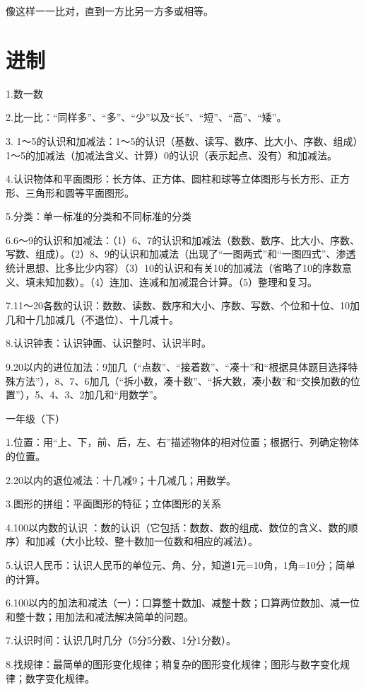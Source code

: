 像这样一一比对，直到一方比另一方多或相等。

\section{进制}

1.数一数

2.比一比：“同样多”、“多”、“少”以及“长”、“短”、“高”、“矮”。

3. 1～5的认识和加减法：1～5的认识（基数、读写、数序、比大小、序数、组成）1～5的加减法（加减法含义、计算）0的认识（表示起点、没有）和加减法。

4.认识物体和平面图形：长方体、正方体、圆柱和球等立体图形与长方形、正方形、三角形和圆等平面图形。

5.分类：单一标准的分类和不同标准的分类

6.6～9的认识和加减法：（1）6、7的认识和加减法（数数、数序、比大小、序数、写数、组成）。（2）8、9的认识和加减法（出现了“一图两式”和“一图四式”、渗透统计思想、比多比少内容）（3）10的认识和有关10的加减法（省略了10的序数意义、填未知加数）。（4）连加、连减和加减混合计算。（5）整理和复习。

7.11～20各数的认识：数数、读数、数序和大小、序数、写数、个位和十位、10加几和十几加减几（不退位）、十几减十。

8.认识钟表：认识钟面、认识整时、认识半时。

9.20以内的进位加法：9加几（“点数”、“接着数”、“凑十”和“根据具体题目选择特殊方法”），8、7、6加几（“拆小数，凑十数”、“拆大数，凑小数”和“交换加数的位置”），5、4、3、2加几和“用数学”。

一年级（下）

1.位置：用“上、下，前、后，左、右”描述物体的相对位置；根据行、列确定物体的位置。

2.20以内的退位减法：十几减9；十几减几；用数学。

3.图形的拼组：平面图形的特征；立体图形的关系

4.100以内数的认识 ：数的认识（它包括：数数、数的组成、数位的含义、数的顺序）和加减（大小比较、整十数加一位数和相应的减法）。

5.认识人民币：认识人民币的单位元、角、分，知道1元=10角，1角=10分；简单的计算。

6.100以内的加法和减法（一）：口算整十数加、减整十数；口算两位数加、减一位和整十数；用加法和减法解决简单的问题。

7.认识时间：认识几时几分（5分5分数、1分1分数）。

8.找规律：最简单的图形变化规律；稍复杂的图形变化规律；图形与数字变化规律；数字变化规律。

